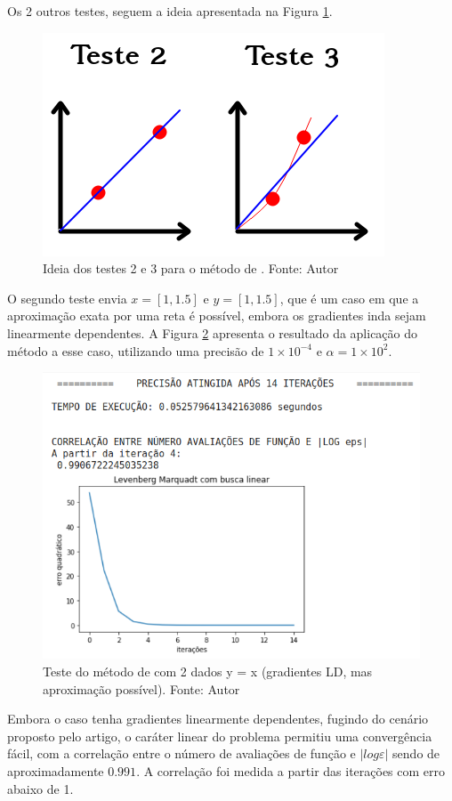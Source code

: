 \documentclass[11pt]{article}
\begin{document}
Os 2 outros testes, seguem a ideia apresentada na Figura \ref{t23}.
\begin{figure}[H]
\center
\includegraphics[scale=0.5]{Figuras/2testes.png}
\caption{Ideia dos testes 2 e 3 para o método de \cite{bmLS}. Fonte: Autor} 
\label{t23}
\end{figure}
O segundo teste envia $x = [1,1.5]$ e $y = [1,1.5]$, que é um caso em que a aproximação exata por uma reta é possível, embora os gradientes inda sejam linearmente dependentes. A Figura \ref{lmbl2} apresenta o resultado da aplicação do método a esse caso, utilizando uma precisão de $1\times10^{-4}$ e $\alpha = 1\times10^{2}$.
\begin{figure}[H]
\center
\includegraphics[scale=0.7]{Figuras/lmbl2.png}
\caption{Teste do método de \cite{bmLS} com 2 dados y = x (gradientes LD, mas aproximação possível). Fonte: Autor} 
\label{lmbl2}
\end{figure}

Embora o caso tenha gradientes linearmente dependentes, fugindo do cenário proposto pelo artigo, o caráter linear do problema permitiu uma convergência fácil, com a correlação entre o número de avaliações de função e $|log \varepsilon|$ sendo de aproximadamente $0.991$. A correlação foi medida a partir das iterações com erro abaixo de 1.
\end{document}
